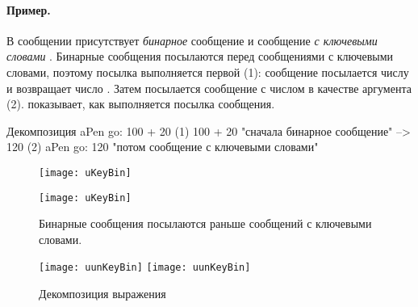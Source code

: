 \documentclass[a4paper,10pt,twoside]{book}
\begin{document}
\paragraph{Пример.} В сообщении  присутствует \emph{бинарное} сообщение  и сообщение \emph{с ключевыми словами} . Бинарные сообщения посылаются перед сообщениями с ключевыми словами, поэтому посылка  выполняется первой (1): сообщение  посылается числу  и возвращает число . Затем посылается сообщение  с числом  в качестве аргумента (2).
 показывает, как выполняется посылка сообщения.

\begin{example}[decGo]{Декомпозиция }{}
      aPen go: 100 + 20   
(1)                 100 + 20           "сначала бинарное сообщение"
                   -->   120
(2)  aPen go: 120                   "потом сообщение с ключевыми словами"
\end{example}

\begin{figure}[htb]
\begin{minipage}{0.48\textwidth}
	\ifluluelse
		{\centerline{\texttt{[image: uKeyBin]}}}
		{\centerline{\texttt{[image: uKeyBin]}}}
	\caption{Бинарные сообщения посылаются раньше сообщений с ключевыми словами.\figlabel{uKeyBin}}
\end{minipage}
\hfill
\begin{minipage}{0.48\textwidth}
	\begin{center}
	\ifluluelse
		{\texttt{[image: uunKeyBin]}}
		{\texttt{[image: uunKeyBin]}}
\caption{Декомпозиция выражения }
\end{center}
\end{minipage}
\end{figure}

\end{document}
